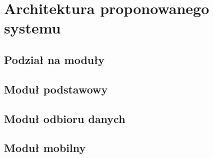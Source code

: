 \chapter{Architektura proponowanego systemu}
\label{chap:ArchCal}

\section[Podział na moduły][Podział na moduły]{Podział na moduły}

\section[Moduł podstawowy][Moduł podstawowy]{Moduł podstawowy}

\section[Moduł odbioru danych][Moduł odbioru danych]{Moduł odbioru danych}

\section[Moduł mobilny][Moduł mobilny]{Moduł mobilny}
